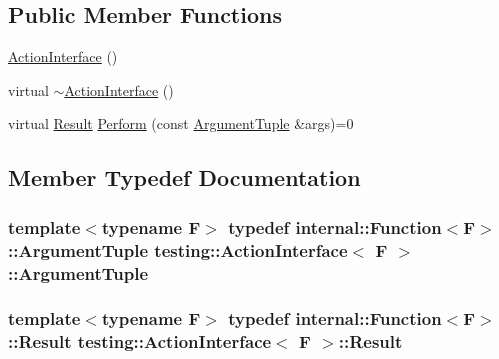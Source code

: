 \subsection*{Public Member Functions}
\begin{DoxyCompactItemize}
\item 
\hyperlink{classtesting_1_1_action_interface_a0f1d44e4c669a9cae5ee5b28419a6f52}{Action\+Interface} ()
\item 
virtual \hyperlink{classtesting_1_1_action_interface_a7dd0a5fc93d86ae3c9d04963b9f3a93f}{$\sim$\+Action\+Interface} ()
\item 
virtual \hyperlink{classtesting_1_1_action_interface_a7477de2fe3e4e01c59db698203acaee7}{Result} \hyperlink{classtesting_1_1_action_interface_a20f8624fcea1786f2992b358760422a0}{Perform} (const \hyperlink{classtesting_1_1_action_interface_af72720d864da4d606629e83edc003511}{Argument\+Tuple} \&args)=0
\end{DoxyCompactItemize}


\subsection{Member Typedef Documentation}
\subsubsection[{\texorpdfstring{Argument\+Tuple}{ArgumentTuple}}]{\setlength{\rightskip}{0pt plus 5cm}template$<$typename F$>$ typedef {\bf internal\+::\+Function}$<$F$>$\+::{\bf Argument\+Tuple} {\bf testing\+::\+Action\+Interface}$<$ F $>$\+::{\bf Argument\+Tuple}}\hypertarget{classtesting_1_1_action_interface_af72720d864da4d606629e83edc003511}{}\label{classtesting_1_1_action_interface_af72720d864da4d606629e83edc003511}
\subsubsection[{\texorpdfstring{Result}{Result}}]{\setlength{\rightskip}{0pt plus 5cm}template$<$typename F$>$ typedef {\bf internal\+::\+Function}$<$F$>$\+::{\bf Result} {\bf testing\+::\+Action\+Interface}$<$ F $>$\+::{\bf Result}}\hypertarget{classtesting_1_1_action_interface_a7477de2fe3e4e01c59db698203acaee7}{}\label{classtesting_1_1_action_interface_a7477de2fe3e4e01c59db698203acaee7}


